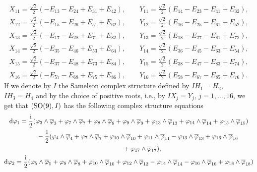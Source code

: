 \documentclass[10pt,a4paper]{amsart}
\numberwithin{equation}{section}
\begin{document}
\begin{Example}
\begin{gather*}
 X_{11} = \frac{\sqrt{2}}{2} (-E_{13} - E_{24} + E_{31} + E_{42}), \qquad Y_{11} = \frac{\sqrt{2}}{2} (E_{14} - E_{23} - E_{41} + E_{32}),\\
 X_{12} = \frac{\sqrt{2}}{2} (-E_{15} - E_{26} + E_{51} + E_{62}), \qquad Y_{12} = \frac{\sqrt{2}}{2} (E_{16} - E_{25} - E_{61} + E_{52}),\\
 X_{13} = \frac{\sqrt{2}}{2} (-E_{17} - E_{28} + E_{71} + E_{82}), \qquad Y_{13} = \frac{\sqrt{2}}{2} (E_{18} - E_{27} - E_{81} + E_{72}),
\\
 X_{14} = \frac{\sqrt{2}}{2} (-E_{35} - E_{46} + E_{53} + E_{64}), \qquad Y_{14} = \frac{\sqrt{2}}{2} (E_{36} - E_{45} - E_{63} + E_{54}),\\
 X_{15} = \frac{\sqrt{2}}{2} (-E_{37} - E_{48} + E_{73} + E_{84}), \qquad Y_{15} = \frac{\sqrt{2}}{2} (E_{38} - E_{47} - E_{83} + E_{74}),\\
 X_{16} = \frac{\sqrt{2}}{2} (-E_{57} - E_{68} + E_{75} + E_{86}), \qquad Y_{16} = \frac{\sqrt{2}}{2} (E_{58} - E_{67} - E_{85} + E_{76}).
\end{gather*}
If we denote by $I$ the Samelson complex structure defined by $I H_1= H_2$, $I H_3 = H_4$ and by the choice of positive roots, i.e., by $I X_j= Y_j$, $j = 1, \dots, 16$, we get that $({\rm SO}(9), I)$ has the following complex structure equations
\begin{gather*}
{\rm d} \varphi_1 = \frac{{\rm i}}{2} ( \varphi_3 \wedge \overline \varphi_3 + \varphi_7 \wedge \overline \varphi_7 + \varphi_8 \wedge \overline \varphi_8 + \varphi_9 \wedge \overline \varphi_9 + \varphi_{13} \wedge \overline \varphi_{13} + \varphi_{14} \wedge \overline \varphi_{14} +\varphi_{15} \wedge \overline \varphi_{15})\\
 \hphantom{{\rm d} \varphi_1 =}{} - \frac{1}{2} ( \varphi_4 \wedge \overline \varphi_4 + \varphi_7 \wedge \overline \varphi_7 + \varphi_{10} \wedge \overline \varphi_{10} + \varphi_{11} \wedge \overline \varphi_{11} - \varphi_{13} \wedge \overline \varphi_{13} +\varphi_{16} \wedge \overline \varphi_{16}\\
\hphantom{{\rm d} \varphi_1 =\frac{{\rm i}}{2} ( }{}
 +\varphi_{17} \wedge \overline \varphi_{17}),\\
{\rm d} \varphi_2 = \frac{{\rm i}}{2} ( \varphi_5 \wedge \overline \varphi_5 + \varphi_8 \wedge \overline \varphi_8 + \varphi_{10} \wedge \overline \varphi_{10} + \varphi_{12} \wedge \overline \varphi_{12} - \varphi_{14} \wedge \overline \varphi_{14} - \varphi_{16} \wedge \overline \varphi_{16} +\varphi_{18} \wedge \overline \varphi_{18})\\

\end{gather*}
\end{Example}
\end{document}
